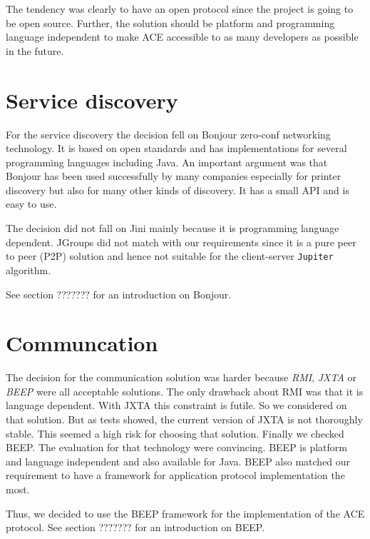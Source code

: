 The tendency was clearly to have an open protocol since the project is going to be open source. Further, the solution should be platform and programming language independent to make ACE accessible to as many developers as possible in the future.

\section{Service discovery}
For the service discovery the decision fell on Bonjour zero-conf networking technology. It is based on open standards and has implementations for several programming languages including Java. An important argument was that Bonjour has been used successfully by many companies especially for printer discovery but also for many other kinds of discovery. It has a small API and is easy to use. 

The decision did not fall on Jini mainly because it is programming language dependent. JGroups did not match with our requirements since it is a pure peer to peer (P2P) solution and hence not suitable for the client-server \texttt{Jupiter} algorithm.

See section ??????? for an introduction on  Bonjour.

\section{Communcation}
The decision for the communication solution was harder because \emph{RMI}, \emph{JXTA} or \emph{BEEP} were all acceptable solutions. The only drawback about RMI was that it is language dependent. With JXTA this constraint is futile. So we considered on that solution. But as tests showed, the current version of JXTA is not thoroughly stable. This seemed a high risk for choosing that solution. Finally we checked BEEP. The evaluation for that technology were convincing. BEEP is platform and language independent and also available for Java. BEEP also matched our requirement to have a framework for application protocol implementation the most.

Thus, we decided to use the BEEP framework for the implementation of the ACE protocol. See section ??????? for an introduction on BEEP.

